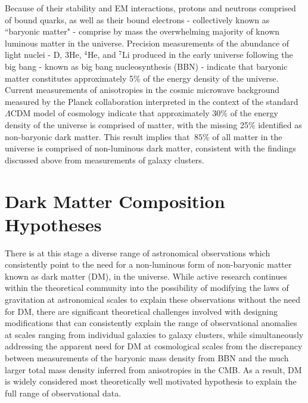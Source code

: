Because of their stability and EM interactions, protons and neutrons comprised of bound quarks, as well as their bound electrons - collectively known as ``baryonic matter" - comprise by mass the overwhelming majority of known luminous matter in the universe. Precision measurements of the abundance of light nuclei - D, 3He, \(^4\)He, and \(^7\)Li  produced in the early universe following the big bang - known as big bang nucleosynthesis (BBN) \cite{pdg_2018} - indicate that baryonic matter constitutes approximately 5\% \cite{pdg_2018} of the energy density of the universe. Current measurements of anisotropies in the cosmic microwave background \cite{cmb_1965} measured by the Planck collaboration \cite{Planck_2020} interpreted in the context of the standard \(\Lambda\)CDM model of cosmology \cite{pdg_2018} indicate that approximately 30\% of the energy density of the universe is comprised of matter, with the missing 25\% identified as non-baryonic dark matter. This result implies that \(~85\%\) of all matter in the universe is comprised of non-luminous dark matter, consistent with the findings discussed above from measurements of galaxy clusters.

\section{Dark Matter Composition Hypotheses}

There is at this stage a diverse range of astronomical observations which consistently point to the need for a non-luminous form of non-baryonic matter known as dark matter (DM), in the universe. While active research continues within the theoretical community \cite{mond_2012, mond_2021} into the possibility of modifying the laws of gravitation at astronomical scales to explain these observations without the need for DM, there are significant theoretical challenges involved with designing modifications that can consistently explain the range of observational anomalies at scales ranging from individual galaxies to galaxy clusters, while simultaneously addressing the apparent need for DM at cosmological scales from the discrepancy between measurements of the baryonic mass density from BBN and the much larger total mass density inferred from anisotropies in the CMB. As a result, DM is widely considered most theoretically well motivated hypothesis to explain the full range of observational data.

